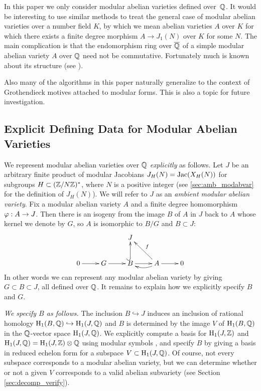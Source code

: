 \documentclass{article}
\begin{document}
\begin{remark}
  In this paper we only consider modular abelian varieties defined
  over~$\mathbb{Q}$.  It would be interesting to use similar methods to treat
  the general case of modular abelian varieties over a number field
  $K$, by which we mean abelian varieties $A$ over $K$ for which there
  exists a finite degree morphism $A\to J_1(N)$ over $K$ for some
  $N$. The main complication is that the endomorphism ring over
  $\overline{\mathbb{Q}}$ of a simple modular abelian variety $A$ over $\mathbb{Q}$ need not
  be commutative.  Fortunately much is known about its structure (see
  \cite{ribet:twistsendoalg}).

  Also many of the algorithms in this paper naturally generalize to
  the context of Grothendieck motives attached to modular forms.  This
  is also a topic for future investigation.
\end{remark}



\subsection{Explicit Defining Data for Modular Abelian Varieties}
We represent modular abelian varieties over $\mathbb{Q}$ {\em explicitly} as
follows. Let $J$ be an arbitrary finite product of modular Jacobians
$J_H(N)=\operatorname{Jac}(X_H(N))$ for subgroups $H\subset (\mathbb{Z}/N\mathbb{Z})^*$, where
$N$ is a positive integer (see \ref{sec:amb_modabvar} for the definition
of $J_H(N)$).  We will refer to $J$ as an \emph{ambient modular abelian
variety}.
Fix a modular abelian variety $A$ and a
finite degree homomorphism $\varphi: A\to J$.  Then there is an isogeny
from the image $B$ of $A$ in $J$ back to $A$ whose kernel we denote by
$G$, so $A$ is isomorphic to $B/G$ and $B\subset J$:
$$
\xymatrix{
   & & J & & \\
   0\ar[r]& G \ar[r]& B\ar@{^(->}[u] \ar[r]& A\ar[r] \ar@/^/[l]\ar[ul]_{f} & 0
}
$$
In other words we can represent any modular abelian variety by giving
$G\subset B\subset J$, all defined over $\mathbb{Q}$.  It remains to explain
how we explicitly specify $B$ and $G$.

{\em We specify $B$ as follows.}  The inclusion $B \hookrightarrow J$
induces an inclusion of rational homology $\operatorname{H}_1(B, \mathbb{Q}) \hookrightarrow
\operatorname{H}_1(J, \mathbb{Q})$ and $B$ is determined by the image $V$ of $\operatorname{H}_1(B,\mathbb{Q})$ in
the $\mathbb{Q}$-vector space $\operatorname{H}_1(J,\mathbb{Q})$.  We explicitly compute a basis for
$\operatorname{H}_1(J,\mathbb{Z})$ and $\operatorname{H}_1(J,\mathbb{Q})=\operatorname{H}_1(J,\mathbb{Z})\otimes \mathbb{Q}$ using modular
symbols \cite{stein:modform}, and specify $B$ by giving a basis in
reduced echelon form for a subspace $V \subset \operatorname{H}_1(J, \mathbb{Q})$.  Of
course, not every subspace corresponds to a modular abelian variety,
but we can determine whether or not a given $V$ corresponds to a valid
abelian subvariety (see Section \ref{sec:decomp_verify}).
\end{document}
